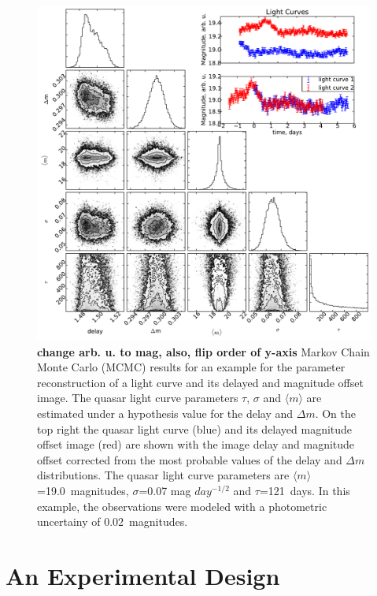 \documentclass{emulateapj}
\begin{document}
\begin{figure}[t]
\begin{center}
\includegraphics[width=\linewidth]{./triangle_example.pdf}
\caption{{\bf change arb. u. to mag, also, flip order of y-axis} 
  Markov Chain Monte Carlo (MCMC) results for an example for
  the parameter reconstruction of a light curve and its delayed and
  magnitude offset image. The quasar light curve parameters $\tau$,
  $\sigma$ and $\langle m \rangle$ are estimated under a hypothesis
  value for the delay and $\Delta m$. On the top right the quasar
  light curve (blue) and its delayed magnitude offset image (red) are
  shown with the image delay and magnitude offset corrected from the
  most probable values of the delay and $\Delta m$
  distributions. The quasar light curve parameters are 
  $\langle m \rangle$=19.0~magnitudes, $\sigma$=0.07 mag $day^{-1/2}$
  and $\tau$=121~days. In this example, the observations were modeled
  with a photometric uncertainy of 0.02~magnitudes.}\label{fig:triangle}
\end{center}
\end{figure}

\section{An Experimental Design}\label{sec:experiment}
\end{document}
